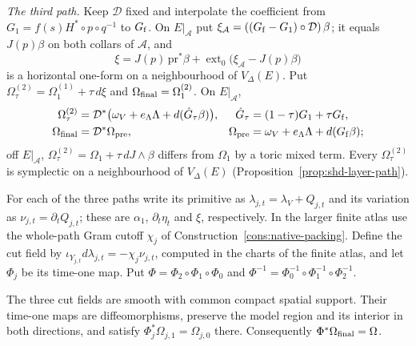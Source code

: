 \emph{The third path.} Keep $\mathcal D$ fixed and interpolate the coefficient from $G_1=f(s)H^*\circ p\circ q^{-1}$ to
$G_{\rm f}$. On $E|_{\mathcal A}$ put $\xi_{\mathcal A}=((G_{\rm f}-G_1)\circ\mathcal D)\,\beta$; it equals $J(p)\beta$ on both
collars of $\mathcal A$, and
\begin{equation}\label{eq:hdl-xi}
 \xi=J(p)\,\mathrm{pr}^*\beta+\operatorname{ext}_0\big(\xi_{\mathcal A}-J(p)\beta\big)
\end{equation}
is a horizontal one-form on a neighbourhood of $V_\Delta(E)$. Put $\Omega^{(2)}_\tau=\Omega^{(1)}_1+\tau\,d\xi$ and
$\Omega_{\rm final}=\Omega^{(2)}_1$. On $E|_{\mathcal A}$,
\begin{equation}\label{eq:hdl-final}
\begin{aligned}
 \Omega^{(2)}_\tau&=\mathcal D^*\big(\omega_V+e_\Lambda\Lambda+d(\hat G_\tau\beta)\big),&\hat G_\tau&=(1-\tau)G_1+\tau G_{\rm f},\\
 \Omega_{\rm final}&=\mathcal D^*\Omega_{\rm pre},&\Omega_{\rm pre}&=\omega_V+e_\Lambda\Lambda+d(G_{\rm f}\beta);
\end{aligned}
\end{equation}
off $E|_{\mathcal A}$, $\Omega^{(2)}_\tau=\Omega_1+\tau\,dJ\wedge\beta$ differs from $\Omega_1$ by a toric mixed term. Every
$\Omega^{(2)}_\tau$ is symplectic on a neighbourhood of $V_\Delta(E)$ (Proposition~\ref{prop:shd-layer-path}).

For each of the three paths write its primitive as $\lambda_{j,t}=\lambda_V+Q_{j,t}$ and its variation
as $\nu_{j,t}=\partial_tQ_{j,t}$; these are $\alpha_1$, $\partial_t\eta_t$ and $\xi$, respectively.
In the larger finite atlas use the whole-path Gram cutoff $\chi_j$ of
Construction~\ref{cons:native-packing}. Define the cut field by
$\iota_{Y_{j,t}}d\lambda_{j,t}=-\chi_j\nu_{j,t}$, computed in the charts of the finite atlas, and let $\Phi_j$ be
its time-one map. Put $\Phi=\Phi_2\circ\Phi_1\circ\Phi_0$ and $\Phi^{-1}=\Phi_0^{-1}\circ\Phi_1^{-1}\circ\Phi_2^{-1}$.

\begin{proposition}\label{prop:hdl-faces}
The three cut fields are smooth with common compact spatial support. Their time-one maps are
diffeomorphisms, preserve the model region and its interior in both directions, and satisfy
$\Phi_j^*\Omega_{j,1}=\Omega_{j,0}$ there. Consequently $\Phi^*\Omega_{\rm final}=\Omega$.
\end{proposition}

